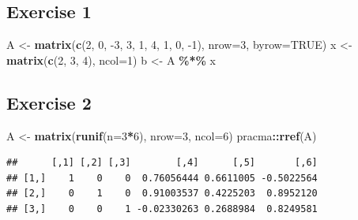 \documentclass[
]{book}
\newenvironment{Shaded}{\begin{snugshade}}{\end{snugshade}}
\newcommand{\DataTypeTok}[1]{\textcolor[rgb]{0.13,0.29,0.53}{#1}}
\newcommand{\DecValTok}[1]{\textcolor[rgb]{0.00,0.00,0.81}{#1}}
\newcommand{\KeywordTok}[1]{\textcolor[rgb]{0.13,0.29,0.53}{\textbf{#1}}}
\newcommand{\NormalTok}[1]{#1}
\newcommand{\OperatorTok}[1]{\textcolor[rgb]{0.81,0.36,0.00}{\textbf{#1}}}
\newcommand{\OtherTok}[1]{\textcolor[rgb]{0.56,0.35,0.01}{#1}}
\newcommand{\StringTok}[1]{\textcolor[rgb]{0.31,0.60,0.02}{#1}}
\begin{document}
\hypertarget{exercise-1-6}{%
\subsection*{Exercise 1}\label{exercise-1-6}}

\begin{Shaded}
\begin{Highlighting}[]
\NormalTok{A \textless{}{-}}\StringTok{ }\KeywordTok{matrix}\NormalTok{(}\KeywordTok{c}\NormalTok{(}\DecValTok{2}\NormalTok{, }\DecValTok{0}\NormalTok{, }\DecValTok{{-}3}\NormalTok{, }\DecValTok{3}\NormalTok{, }\DecValTok{1}\NormalTok{, }\DecValTok{4}\NormalTok{, }\DecValTok{1}\NormalTok{, }\DecValTok{0}\NormalTok{, }\DecValTok{{-}1}\NormalTok{), }\DataTypeTok{nrow=}\DecValTok{3}\NormalTok{, }\DataTypeTok{byrow=}\OtherTok{TRUE}\NormalTok{)}
\NormalTok{x \textless{}{-}}\StringTok{ }\KeywordTok{matrix}\NormalTok{(}\KeywordTok{c}\NormalTok{(}\DecValTok{2}\NormalTok{, }\DecValTok{3}\NormalTok{, }\DecValTok{4}\NormalTok{), }\DataTypeTok{ncol=}\DecValTok{1}\NormalTok{)}
\NormalTok{b \textless{}{-}}\StringTok{ }\NormalTok{A }\OperatorTok{\%*\%}\StringTok{ }\NormalTok{x}
\end{Highlighting}
\end{Shaded}

\hypertarget{exercise-2-6}{%
\subsection*{Exercise 2}\label{exercise-2-6}}

\begin{Shaded}
\begin{Highlighting}[]
\NormalTok{A \textless{}{-}}\StringTok{ }\KeywordTok{matrix}\NormalTok{(}\KeywordTok{runif}\NormalTok{(}\DataTypeTok{n=}\DecValTok{3}\OperatorTok{*}\DecValTok{6}\NormalTok{), }\DataTypeTok{nrow=}\DecValTok{3}\NormalTok{, }\DataTypeTok{ncol=}\DecValTok{6}\NormalTok{)}
\NormalTok{pracma}\OperatorTok{::}\KeywordTok{rref}\NormalTok{(A)}
\end{Highlighting}
\end{Shaded}

\begin{verbatim}
##      [,1] [,2] [,3]        [,4]      [,5]       [,6]
## [1,]    1    0    0  0.76056444 0.6611005 -0.5022564
## [2,]    0    1    0  0.91003537 0.4225203  0.8952120
## [3,]    0    0    1 -0.02330263 0.2688984  0.8249581
\end{verbatim}
\end{document}
